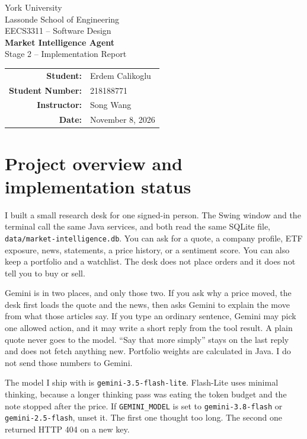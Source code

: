 \documentclass[11pt]{article}
\begin{document}
\begin{titlepage}
\centering
\vspace*{0.75in}
{\Large York University\\[0.15em]}
{\large Lassonde School of Engineering\\[2.4em]}
{\Large EECS3311 -- Software Design\\[2.6em]}
{\Huge\bfseries Market Intelligence Agent\\[0.55em]}
{\Large Stage 2 -- Implementation Report\\[2.15in]}
\begin{tabular}{rl}
\textbf{Student:} & Erdem Calikoglu \\
\textbf{Student Number:} & 218188771 \\
\textbf{Instructor:} & Song Wang \\
\textbf{Date:} & November 8, 2026 \\
\end{tabular}
\vfill
\end{titlepage}

\tableofcontents
\newpage

\section{Project overview and implementation status}

I built a small research desk for one signed-in person. The Swing window and the terminal call the same Java services, and both read the same SQLite file, \texttt{data/market-intelligence.db}. You can ask for a quote, a company profile, ETF exposure, news, statements, a price history, or a sentiment score. You can also keep a portfolio and a watchlist. The desk does not place orders and it does not tell you to buy or sell.

Gemini is in two places, and only those two. If you ask why a price moved, the desk first loads the quote and the news, then asks Gemini to explain the move from what those articles say. If you type an ordinary sentence, Gemini may pick one allowed action, and it may write a short reply from the tool result. A plain quote never goes to the model. ``Say that more simply'' stays on the last reply and does not fetch anything new. Portfolio weights are calculated in Java. I do not send those numbers to Gemini.

The model I ship with is \texttt{gemini-3.5-flash-lite}. Flash-Lite uses minimal thinking, because a longer thinking pass was eating the token budget and the note stopped after the price. If \texttt{GEMINI\_MODEL} is set to \texttt{gemini-3.8-flash} or \texttt{gemini-2.5-flash}, unset it. The first one thought too long. The second one returned HTTP 404 on a new key.
\end{document}
